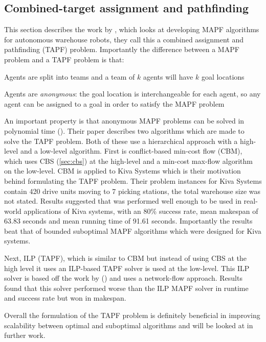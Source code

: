 \documentclass[a4paper,11pt]{article}
\begin{document}
\subsection{Combined-target assignment and pathfinding} \label{sec:tapf}
This section describes the work by \cite{ma2016optimal}, which looks at developing MAPF algorithms for autonomous warehouse robots, they call this a combined assignment and pathfinding (TAPF) problem. Importantly the difference between a MAPF problem and a TAPF problem is that:

\begin{compactitem}
	\item Agents are split into teams and a team of $k$ agents will have $k$ goal locations
	\item Agents are \textit{anonymous}: the goal location is interchangeable for each agent, so any agent can be assigned to a goal in order to satisfy the MAPF problem
\end{compactitem}

An important property is that anonymous MAPF problems can be solved in polynomial time (\cite{yu2013multi}). Their paper describes two algorithms which are made to solve the TAPF problem. Both of these use a hierarchical approach with a high-level and a low-level algorithm. First is conflict-based min-cost flow (CBM), which uses CBS (\ref{sec:cbs}) at the high-level and a min-cost max-flow algorithm on the low-level. CBM is applied to Kiva Systems which is their motivation behind formulating the TAPF problem. Their problem instances for Kiva Systems contain 420 drive units moving to 7 picking stations, the total warehouse size was not stated. Results suggested that  was performed well enough to be used in real-world applications of Kiva systems, with an 80\% success rate, mean makespan of 63.83 seconds and mean running time of 91.61 seconds. Importantly the results beat that of bounded suboptimal MAPF algorithms which were designed for Kiva systems.

Next, ILP (TAPF), which is similar to CBM but instead of using CBS at the high level it uses an ILP-based TAPF solver is used at the low-level. This ILP solver is based off the work by (\cite{yu2013multi}) and uses a network-flow approach. Results found that this solver performed worse than the ILP MAPF solver in runtime and success rate but won in makespan.

Overall the formulation of the TAPF problem is definitely beneficial in improving scalability between optimal and suboptimal algorithms and will be looked at in further work.
\end{document}
